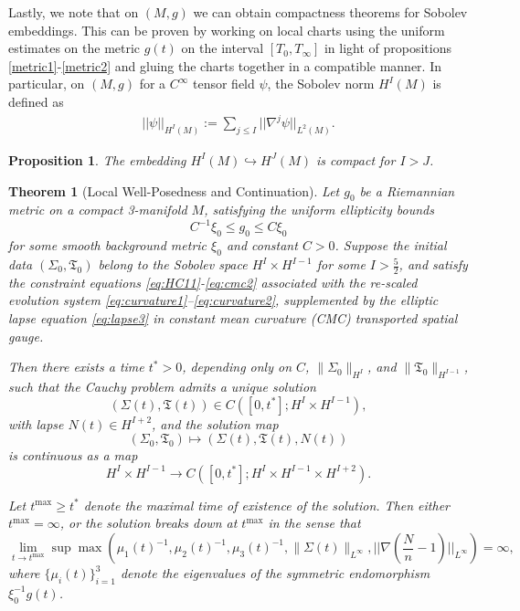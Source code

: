 \documentclass{amsart}
\newtheorem{proposition}{Proposition}[section]
\newtheorem{theorem}{Theorem}[section]
\begin{document}
\noindent Lastly, we note that on $(M,g)$ we can obtain compactness theorems for Sobolev embeddings. This can be proven by working on local charts using the uniform estimates on the metric $g(t)$ on the interval $[T_{0},T_{\infty}]$ in light of propositions \ref{metric1}-\ref{metric2} and gluing the charts together in a compatible manner. In particular, on $(M,g)$ for a $C^{\infty}$ tensor field $\psi$, the Sobolev norm $H^{I}(M)$ is defined as
\begin{align}
 ||\psi||_{H^{I}(M)}:=\sum_{j\leq I}||\nabla^{j}\psi||_{L^{2}(M)}.   
\end{align}
\begin{proposition}
The embedding $H^{I}(M)\hookrightarrow H^{J}(M)$ is compact for $I>J$.      
\end{proposition}
\begin{theorem}[Local Well-Posedness and Continuation]
\label{local}
Let \( g_0 \) be a Riemannian metric on a compact 3-manifold \( M \), satisfying the uniform ellipticity bounds
\[
C^{-1} \xi_0 \leq g_0 \leq C \xi_0
\]
for some smooth background metric \( \xi_0 \) and constant \( C > 0 \). Suppose the initial data \((\Sigma_0, \mathfrak{T}_0)\) belong to the Sobolev space \( H^I \times H^{I-1} \) for some \( I > \frac{5}{2} \), and satisfy the constraint equations \eqref{eq:HC11}-\eqref{eq:cmc2} associated with the re-scaled evolution system \eqref{eq:curvature1}--\eqref{eq:curvature2}, supplemented by the elliptic lapse equation \eqref{eq:lapse3} in constant mean curvature (CMC) transported spatial gauge.

\noindent Then there exists a time \( t^* > 0 \), depending only on \( C \), \( \| \Sigma_0 \|_{H^I} \), and \( \| \mathfrak{T}_0 \|_{H^{I-1}} \), such that the Cauchy problem admits a unique solution
\[
(\Sigma(t), \mathfrak{T}(t)) \in C\left([0, t^*]; H^I \times H^{I-1}\right),
\]
with lapse \( N(t) \in H^{I+2} \), and the solution map
\[
(\Sigma_0, \mathfrak{T}_0) \mapsto (\Sigma(t), \mathfrak{T}(t), N(t))
\]
is continuous as a map
\[
H^I \times H^{I-1} \to C\left([0, t^*]; H^I \times H^{I-1} \times H^{I+2}\right).
\]

\noindent Let \( t^{\max} \geq t^* \) denote the maximal time of existence of the solution. Then either \( t^{\max} = \infty \), or the solution breaks down at \( t^{\max} \) in the sense that
\[
\lim_{t \to t^{\max}} \sup \max \left( \mu_1(t)^{-1}, \mu_2(t)^{-1}, \mu_3(t)^{-1}, \| \Sigma(t) \|_{L^\infty},||\nabla(\frac{N}{n}-1)||_{L^{\infty}} \right) = \infty,
\]
where \( \{ \mu_i(t) \}_{i=1}^3 \) denote the eigenvalues of the symmetric endomorphism \( \xi_0^{-1} g(t) \).
\end{theorem}
\end{document}
